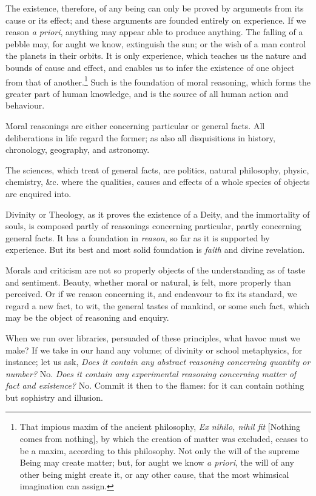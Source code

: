 \documentclass[]{article}
\newcounter{authornote}[page]
\newcommand*{\authornote}[1]{\renewcommand{\thefootnote}{\fnsymbol{footnote}}\stepcounter{authornote}\footnote[\value{authornote}]{#1}\renewcommand{\thefootnote}{\arabic{footnote}}}
\begin{document}
\begin{sectionbody}
\humeparagraph  The existence, therefore, of any being can only be proved by arguments from its cause or its effect; and these arguments are founded entirely on experience. If we reason \emph{a priori}, anything may appear able to produce anything. The falling of a pebble may, for aught we know, extinguish the sun; or the wish of a man control the planets in their orbits. It is only experience, which teaches us the nature and bounds of cause and effect, and enables us to infer the existence of one object from that of another.\authornote{That impious maxim of the ancient philosophy, \emph{Ex nihilo, nihil fit} [Nothing comes from nothing], by which the creation of matter was excluded, ceases to be a maxim, according to this philosophy. Not only the will of the supreme Being may create matter; but, for aught we know \emph{a priori}, the will of any other being might create it, or any other cause, that the most whimsical imagination can assign.} Such is the foundation of moral reasoning, which forms the greater part of human knowledge, and is the source of all human action and behaviour.

\humeparagraph  Moral reasonings are either concerning particular or general facts. All deliberations in life regard the former; as also all disquisitions in history, chronology, geography, and astronomy.

\humeparagraph  The sciences, which treat of general facts, are politics, natural philosophy, physic, chemistry, \&c. where the qualities, causes and effects of a whole species of objects are enquired into.

\humeparagraph  Divinity or Theology, as it proves the existence of a Deity, and the immortality of souls, is composed partly of reasonings concerning particular, partly concerning general facts. It has a foundation in \emph{reason}, so far as it is supported by experience. But its best and most solid foundation is \emph{faith} and divine revelation.

\humeparagraph  Morals and criticism are not so properly objects of the understanding as of taste and sentiment. Beauty, whether moral or natural, is felt, more properly than perceived. Or if we reason concerning it, and endeavour to fix its standard, we regard a new fact, to wit, the general tastes of mankind, or some such fact, which may be the object of reasoning and enquiry.

\humeparagraph  When we run over libraries, persuaded of these principles, what havoc must we make? If we take in our hand any volume; of divinity or school metaphysics, for instance; let us ask, \emph{Does it contain any abstract reasoning concerning quantity or number?} No. \emph{Does it contain any experimental reasoning concerning matter of fact and existence?} No. Commit it then to the flames: for it can contain nothing but sophistry and illusion.

\end{sectionbody}
\end{document}
